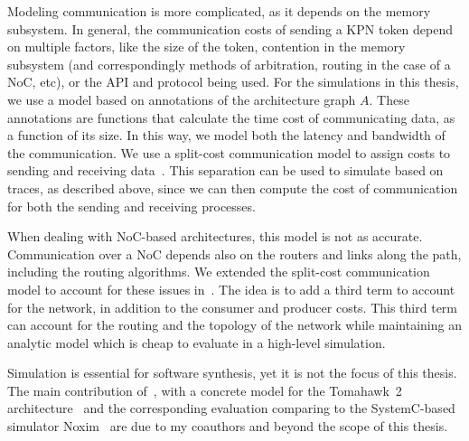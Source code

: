 Modeling communication is more complicated, as it depends on the memory subsystem. In general, the communication costs of sending a KPN token depend on multiple factors, like the size of the token, contention in the memory subsystem (and correspondingly methods of arbitration, routing in the case of a \ac{NoC}, etc), or the API and protocol being used.
For the simulations in this thesis, we use a model based on annotations of the architecture graph $A$. These annotations are functions that calculate the time cost of communicating data, as a function of its size.
In this way, we model both the latency and bandwidth of the communication.
We use a split-cost communication model to assign costs to sending and receiving data~\cite{odendahl2013split}.
This separation can be used to simulate based on traces, as described above, since we can then compute the cost of communication for both the sending and receiving processes.

When dealing with \ac{NoC}-based architectures, this model is not as accurate.
Communication over a \ac{NoC} depends also on the routers and links along the path, including the routing algorithms.
We extended the split-cost communication model to account for these issues in~\cite{menard_norcas16}.
The idea is to add a third term to account for the network, in addition to the consumer and producer costs. 
This third term can account for the routing and the topology of the network while maintaining an analytic model which is cheap to evaluate in a high-level simulation.

Simulation is essential for software synthesis, yet it is not the focus of this thesis. 
The main contribution of~\cite{menard_norcas16}, with a concrete model for the Tomahawk~2 architecture~\cite{tomahawk2} and the corresponding evaluation comparing to the SystemC-based simulator Noxim~\cite{noxim} are due to my coauthors and beyond the scope of this thesis.


